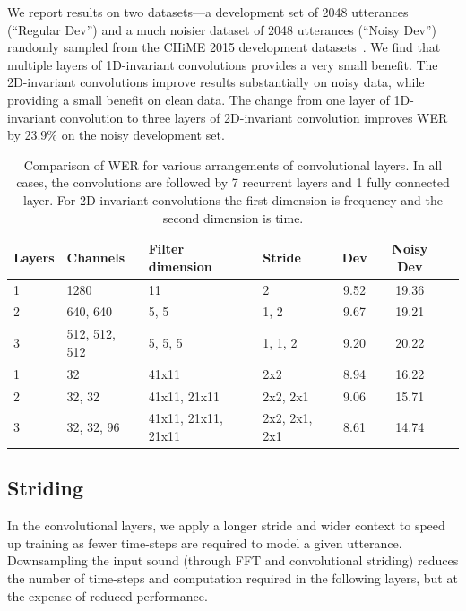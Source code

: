We report results on two datasets---a development set of 2048 utterances
(``Regular Dev'') and a much noisier dataset of 2048 utterances (``Noisy Dev'')
randomly sampled from the CHiME 2015 development
datasets~\cite{barker2015chime}. We find that multiple layers of 1D-invariant
convolutions provides a very small benefit. The 2D-invariant convolutions
improve results substantially on noisy data, while providing a small benefit on
clean data. The change from one layer of 1D-invariant convolution to three
layers of 2D-invariant convolution improves WER by 23.9\% on the noisy
development set.

\begin{table}
\centering
\begin{tabular}{l l l l c c c}
\toprule
Layers & Channels & Filter dimension    & Stride       & Dev         & Noisy Dev \\
\midrule
1 & 1280          & 11                  & 2             & 9.52        & 19.36 \\
2 & 640, 640      & 5, 5                & 1, 2          & 9.67        & 19.21 \\
3 & 512, 512, 512 & 5, 5, 5             & 1, 1, 2       & 9.20        & 20.22 \\
1 & 32            & 41x11               & 2x2           & 8.94        & 16.22 \\
2 & 32, 32        & 41x11, 21x11        & 2x2, 2x1      & 9.06        & 15.71 \\
3 & 32, 32, 96    & 41x11, 21x11, 21x11 & 2x2, 2x1, 2x1 & 8.61        & 14.74 \\
\bottomrule
\end{tabular}
\caption{Comparison of WER for various arrangements of convolutional layers. In
         all cases, the convolutions are followed by 7 recurrent layers and 1 fully
         connected layer. For 2D-invariant convolutions the first dimension is
         frequency and the second dimension is time.}
\label{table:deepspeech2:2dconv}
\end{table}

\subsection{Striding}

In the convolutional layers, we apply a longer stride and wider context to
speed up training as fewer time-steps are required to model a given utterance.
Downsampling the input sound (through FFT and convolutional striding) reduces
the number of time-steps and computation required in the following layers, but
at the expense of reduced performance. 

